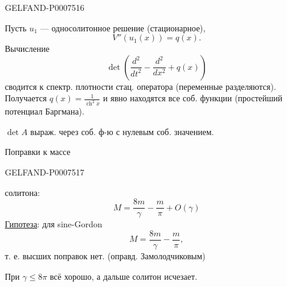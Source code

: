 \begin{GelfandAdjacentEvidence}{GELFAND-P000751}{6}


Пусть \(u_1\) --- односолитонное решение (стационарное),
\begin{equation*}
V''(u_1(x))=q(x).
\tag{42}
\end{equation*}
Вычисление
\begin{equation*}
\det\left(\frac{d^2}{dt^2}-\frac{d^2}{dx^2}+q(x)\right)
\tag{43}
\end{equation*}
сводится к спектр. плотности стац. оператора (переменные разделяются). Получается \(q(x)=\frac1{\operatorname{ch}^2x}\)
и явно находятся все соб. функции (простейший потенциал Баргмана).

\(\det A\) выраж. через соб. ф-ю с нулевым соб. значением.

Поправки к массе
\end{GelfandAdjacentEvidence}
\begin{GelfandAdjacentEvidence}{GELFAND-P000751}{7}

солитона:
\begin{equation*}
M=\frac{8m}{\gamma}-\frac m\pi+O(\gamma)
\tag{44}
\end{equation*}
\underline{Гипотеза}: для sine-Gordon
\begin{equation*}
M=\frac{8m}{\gamma}-\frac m\pi,
\tag{45}
\end{equation*}
т. е. высших поправок нет. (оправд. Замолодчиковым)
\end{GelfandAdjacentEvidence}


При \(\gamma\leq8\pi\) всё хорошо, а дальше солитон исчезает.



